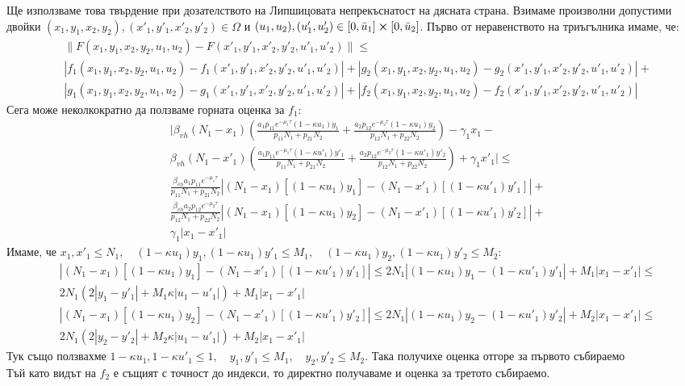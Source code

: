 \documentclass[bulgarian, 12pt]{article}
\begin{document}
Ще използваме това твърдение при дозателството на Липшицовата непрекъснатост на дясната страна. Взимаме произволни допустими двойки $(x_1, y_1, x_2, y_2), (x'_1, y'_1, x'_2, y'_2) \in \Omega$ и $(u_1, u_2), (u'_1, u'_2) \in [0, \bar{u}_1] \cross [0, \bar{u}_2]$.
Първо от неравенството на триъгълника имаме, че:
\begin{align*}
&\|F(x_1, y_1, x_2, y_2, u_1, u_2) - F(x'_1, y'_1, x'_2, y'_2, u'_1, u'_2)\| \leq \\
&|f_1(x_1, y_1, x_2, y_2, u_1, u_2) - f_1(x'_1, y'_1, x'_2, y'_2, u'_1, u'_2)| + |g_2(x_1, y_1, x_2, y_2, u_1, u_2) - g_2(x'_1, y'_1, x'_2, y'_2, u'_1, u'_2)| + \\
&|g_1(x_1, y_1, x_2, y_2, u_1, u_2) - g_1(x'_1, y'_1, x'_2, y'_2, u'_1, u'_2)| + |f_2(x_1, y_1, x_2, y_2, u_1, u_2) - f_2(x'_1, y'_1, x'_2, y'_2, u'_1, u'_2)|
\end{align*}
Сега може неколкократно да ползваме горната оценка за $f_1$:
\begin{align*}
&\bigg|\beta_{vh} (N_1-x_1) \left(\frac{a_1 p_{11} e^{-\mu_1 \tau} (1-\kappa u_1) y_1}{p_{11} N_1 + p_{21} N_2} + \frac{a_2 p_{12} e^{-\mu_2 \tau} (1-\kappa u_1) y_2}{p_{12} N_1 + p_{22} N_2 }\right) - \gamma_1 x_1 - \\
&\beta_{vh} (N_1-x'_1) \left(\frac{a_1 p_{11} e^{-\mu_1 \tau} (1-\kappa u'_1) y'_1}{p_{11} N_1 + p_{21} N_2} + \frac{a_2 p_{12} e^{-\mu_2 \tau} (1-\kappa u'_1) y'_2}{p_{12} N_1 + p_{22} N_2 }\right) + \gamma_1 x'_1\bigg| \leq \\
&\frac{\beta_{vh} a_1 p_{11} e^{-\mu_1 \tau}}{p_{11} N_1 + p_{21} N_2} \left|(N_1-x_1) [(1-\kappa u_1) y_1] - (N_1-x'_1) [(1-\kappa u'_1) y'_1]\right| + \\
&\frac{\beta_{vh} a_2 p_{12} e^{-\mu_2 \tau}}{p_{12} N_1 + p_{22} N_2} \left|(N_1-x_1) [(1-\kappa u_1) y_2] - (N_1-x'_1) [(1-\kappa u'_1) y'_2]\right| + \\
&\gamma_1 |x_1-x'_1|
\end{align*}
Имаме, че $x_1, x'_1 \leq N_1, \quad (1-\kappa u_1)y_1, (1-\kappa u_1) y'_1 \leq M_1, \quad (1-\kappa u_1)y_2, (1-\kappa u_1) y'_2 \leq M_2$:
\begin{align*}
  &\left|(N_1-x_1) [(1-\kappa u_1) y_1] - (N_1-x'_1) [(1-\kappa u'_1) y'_1]\right| \leq 2 N_1 |(1-\kappa u_1) y_1 - (1-\kappa u'_1) y'_1| + M_1 |x_1 - x'_1| \leq \\
  &2 N_1 (2|y_1 - y'_1| + M_1 \kappa |u_1 - u'_1|) + M_1 |x_1 - x'_1| \\
  &\left|(N_1-x_1) [(1-\kappa u_1) y_2] - (N_1-x'_1) [(1-\kappa u'_1) y'_2]\right| \leq 2 N_1 |(1-\kappa u_1) y_2 - (1-\kappa u'_1) y'_2| + M_2 |x_1 - x'_1| \leq \\
  &2 N_1 (2|y_2 - y'_2| + M_2 \kappa |u_1 - u'_1|) + M_2 |x_1 - x'_1|
\end{align*}
Тук също ползвахме $1-\kappa u_1, 1-\kappa u'_1 \leq 1, \quad y_1, y'_1 \leq M_1, \quad y_2, y'_2 \leq M_2$. Така получихе оценка отгоре за първото събираемо \\
Тъй като видът на $f_2$ е същият с точност до индекси, то директно получаваме и оценка за третото събираемо. \\
\end{document}
